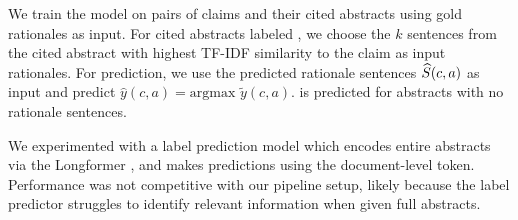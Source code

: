 We train the model on pairs of claims and their cited abstracts using gold rationales as input. For cited abstracts labeled \notenough, we choose the $k$ sentences from the cited abstract with highest TF-IDF similarity to the claim as input rationales. For prediction, we use the predicted rationale sentences $\widehat{S}(c, a)$ as input and predict $\hat{y}(c, a) = \textrm{argmax }\tilde{y}(c, a)$. \notenough is predicted for abstracts with no rationale sentences.

We experimented with a label prediction model which encodes entire abstracts via the Longformer \cite{Beltagy2020LongformerTL}, and makes predictions using the document-level \cls token. Performance was not competitive with our pipeline setup, likely because the label predictor struggles to identify relevant information when given full abstracts.